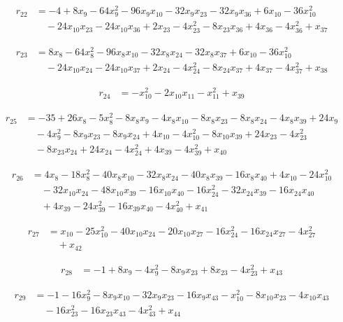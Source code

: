 \begin{align*}
r_{22}&=-4+8x_{9}-64x_{9}^{2}-96x_{9}x_{10}-32x_{9}x_{23}-32x_{9}x_{36}+6x_{10}-36x_{10}^{2}\\
&\quad -24x_{10}x_{23}-24x_{10}x_{36}+2x_{23}-4x_{23}^{2}-8x_{23}x_{36}+4x_{36}-4x_{36}^{2}+x_{37}
\end{align*}

\begin{align*}
r_{23}&=8x_{8}-64x_{8}^{2}-96x_{8}x_{10}-32x_{8}x_{24}-32x_{8}x_{37}+6x_{10}-36x_{10}^{2}\\
&\quad -24x_{10}x_{24}-24x_{10}x_{37}+2x_{24}-4x_{24}^{2}-8x_{24}x_{37}+4x_{37}-4x_{37}^{2}+x_{38}
\end{align*}

\begin{align*}
r_{24}&=-x_{10}^{2}-2x_{10}x_{11}-x_{11}^{2}+x_{39}
\end{align*}

\begin{align*}
r_{25}&=-35+26x_{8}-5x_{8}^{2}-8x_{8}x_{9}-4x_{8}x_{10}-8x_{8}x_{23}-8x_{8}x_{24}-4x_{8}x_{39}+24x_{9}\\
&\quad -4x_{9}^{2}-8x_{9}x_{23}-8x_{9}x_{24}+4x_{10}-4x_{10}^{2}-8x_{10}x_{39}+24x_{23}-4x_{23}^{2}\\
&\quad -8x_{23}x_{24}+24x_{24}-4x_{24}^{2}+4x_{39}-4x_{39}^{2}+x_{40}
\end{align*}

\begin{align*}
r_{26}&=4x_{8}-18x_{8}^{2}-40x_{8}x_{10}-32x_{8}x_{24}-40x_{8}x_{39}-16x_{8}x_{40}+4x_{10}-24x_{10}^{2}\\
&\quad -32x_{10}x_{24}-48x_{10}x_{39}-16x_{10}x_{40}-16x_{24}^{2}-32x_{24}x_{39}-16x_{24}x_{40}\\
&\quad +4x_{39}-24x_{39}^{2}-16x_{39}x_{40}-4x_{40}^{2}+x_{41}
\end{align*}

\begin{align*}
r_{27}&=x_{10}-25x_{10}^{2}-40x_{10}x_{24}-20x_{10}x_{27}-16x_{24}^{2}-16x_{24}x_{27}-4x_{27}^{2}\\
&\quad +x_{42}
\end{align*}

\begin{align*}
r_{28}&=-1+8x_{9}-4x_{9}^{2}-8x_{9}x_{23}+8x_{23}-4x_{23}^{2}+x_{43}
\end{align*}

\begin{align*}
r_{29}&=-1-16x_{9}^{2}-8x_{9}x_{10}-32x_{9}x_{23}-16x_{9}x_{43}-x_{10}^{2}-8x_{10}x_{23}-4x_{10}x_{43}\\
&\quad -16x_{23}^{2}-16x_{23}x_{43}-4x_{43}^{2}+x_{44}
\end{align*}

